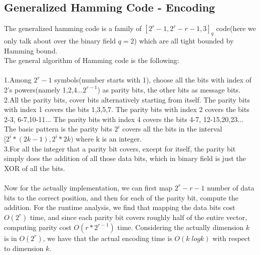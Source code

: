 \documentclass{article}
\begin{document}
\subsection{Generalized Hamming Code - Encoding}
The generalized hamming code is a family of $[2^r-1, 2^r-r-1,3]_q$ code(here we only talk about over the binary field $q=2$) which are all tight bounded by Hamming bound.\\
The general algorithm of Hamming code is the following:\\\\
1.Among $2^r-1$ symbols(number starts with 1), choose all the bits with index of 2's powers(namely 1,2,4...$2^{r-1}$) as parity bits, the other bits as message bits.\\
2.All the parity bits, cover bits alternatively starting from itself. The parity bits with index 1 covers the bits 1,3,5,7. The parity bits with index 2 covers the bits 2-3, 6-7,10-11... The parity bits with index 4 covers the bits 4-7, 12-15,20,23... The basic pattern is the parity bits $2^i$ covers all the bits in the interval $[2^i*(2k-1), 2^i*2k )$ where k is an integer.\\
3.For all the integer that a parity bit covers, except for itself, the parity bit simply does the addition of all those data bits, which in binary field is just the XOR of all the bits.\\\\
Now for the actually implementation, we can first map $2^r-r-1$ number of data bits to the correct position, and then for each of the parity bit, compute the addition. For the runtime analysis, we find that mapping the data bits cost $O(2^r)$ time, and since each parity bit covers roughly half of the entire vector, computing parity cost $O(r*2^{r-1})$ time. Considering the actually dimension $k$ is in $O(2^r)$, we have that the actual encoding time is $O(k \;logk)$ with respect to dimension $k$.
\end{document}
